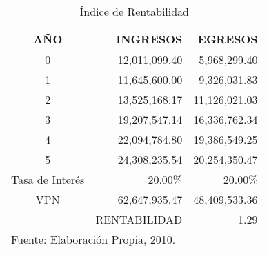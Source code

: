 \begin{table}[h]
    \caption{Índice de Rentabilidad}
    \label{tbl:Indice:Rentabilidad}
    \centering
    \begin{tabular}{c|r|r}
        AÑO             & INGRESOS      & EGRESOS \\
        \hline
        \hline
        0               & 12,011,099.40 & 5,968,299.40 \\
        1               & 11,645,600.00 & 9,326,031.83 \\
        2               & 13,525,168.17 & 11,126,021.03 \\
        3               & 19,207,547.14 & 16,336,762.34 \\
        4               & 22,094,784.80 & 19,386,549.25 \\
        5               & 24,308,235.54 & 20,254,350.47 \\
        \hline
        Tasa de Interés & 20.00\%       & 20.00\% \\
        VPN             & 62,647,935.47 & 48,409,533.36 \\
        \hline
                        & RENTABILIDAD  & 1.29 \\
		\hline
		\multicolumn{3}{l}{\footnotesize Fuente: Elaboración Propia, 2010.}
    \end{tabular}
\end{table}
